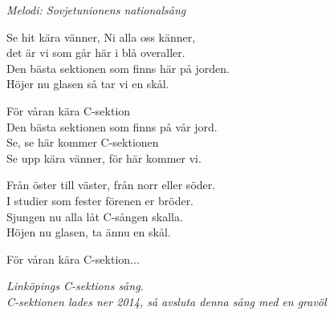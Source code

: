 {\footnotesize\textit{Melodi: Sovjetunionens nationalsång}}\par
\vspace{10pt}
Se hit kära vänner, Ni alla oss känner,\\
det är vi som går här i blå overaller.\\
Den bästa sektionen som finns här på jorden.\\
Höjer nu glasen så tar vi en skål.\par
\vspace{10pt}
\revrpt För våran kära C-sektion\rpt\\
Den bästa sektionen som finns på vår jord.\\
\revrpt Se, se här kommer C-sektionen\rpt\\
Se upp kära vänner, för här kommer vi.\par
\vspace{10pt}
Från öster till väster, från norr eller söder.\\
I studier som fester förenen er bröder.\\
Sjungen nu alla låt C-sången skalla.\\
Höjen nu glasen, ta ännu en skål.\par
\vspace{10pt}
För våran kära C-sektion...\par
\vspace{10pt}
{\footnotesize\textit{Linköpings C-sektions sång. \\
					 C-sektionen lades ner 2014, så avsluta denna sång med en gravöl}}

